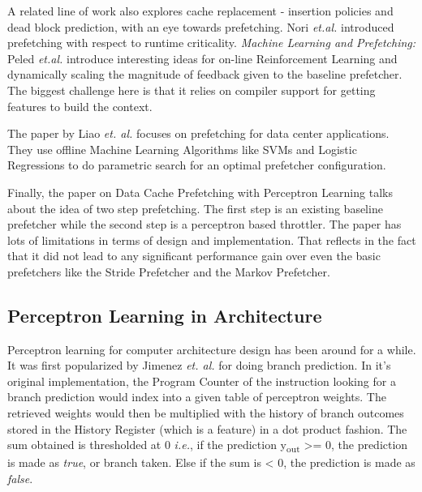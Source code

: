 \documentclass{sig-alternate}
\begin{document}
A related line of work also explores cache replacement - insertion policies and dead block prediction, with an eye towards prefetching. 
\cite{DB_Pred}
\cite{Cache_Burst}
\cite{KPC}
\cite{Harmony}
Nori \textit{et.al.} introduced prefetching with  respect to runtime criticality.
\cite{CATCH}
\newline
\newline
\textit{Machine Learning and Prefetching:}
Peled \textit{et.al.} introduce interesting ideas for on-line Reinforcement Learning and dynamically scaling the magnitude of feedback given to the baseline prefetcher.
\cite{Semantics}
The biggest challenge here is that it relies on compiler support for getting features to build the context.

The paper by Liao \textit{et. al.} focuses on prefetching for data center applications.
\cite{Datacenter}
They use offline Machine Learning Algorithms like SVMs and Logistic Regressions to do parametric search for an optimal prefetcher configuration.

Finally, the paper on Data Cache Prefetching with Perceptron Learning\cite{BadPerc} talks about the idea of two step prefetching.
The first step is an existing baseline prefetcher while the second step is a perceptron based throttler.
The paper has lots of limitations in terms of design and implementation.
That reflects in the fact that it did not lead to any significant performance gain over even the basic prefetchers like the Stride Prefetcher\cite{Stride} and the Markov Prefetcher\cite{Markov}.


\subsection{Perceptron Learning in Architecture}

Perceptron learning for computer architecture design has been around for a while. 
It was first popularized by Jimenez \textit{et. al.} for doing branch prediction. \cite{Perc_Branch} 
In it's original implementation, the Program Counter of the instruction looking for a branch prediction would index into a given table of perceptron weights. 
The retrieved weights would then be multiplied with the history of branch outcomes stored in the History Register (which is a feature) in a dot product fashion. 
The sum obtained is thresholded at 0 \textit{i.e.}, if the prediction y\textsubscript{out} >= 0, the prediction is made as \textit{true}, or branch taken.
Else if the sum is < 0, the prediction is made as \textit{false}.
\end{document}
